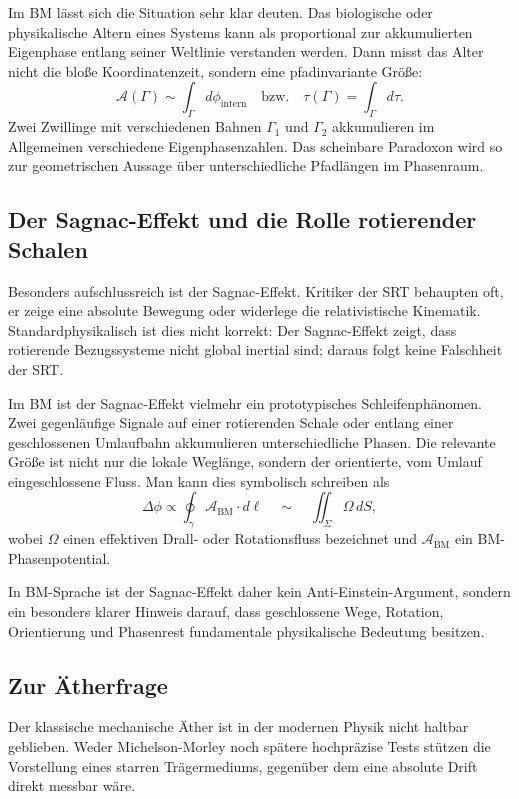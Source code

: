 \documentclass[12pt,a4paper]{article}
\begin{document}
	Im BM lässt sich die Situation sehr klar deuten. Das biologische oder physikalische Altern eines Systems kann als proportional zur akkumulierten Eigenphase entlang seiner Weltlinie verstanden werden. Dann misst das Alter nicht die bloße Koordinatenzeit, sondern eine pfadinvariante Größe:
	\[
	\mathcal{A}(\Gamma) \sim \int_{\Gamma} d\phi_{\mathrm{intern}}
	\quad\text{bzw.}\quad
	\tau(\Gamma) = \int_{\Gamma} d\tau.
	\]
	Zwei Zwillinge mit verschiedenen Bahnen \(\Gamma_1\) und \(\Gamma_2\) akkumulieren im Allgemeinen verschiedene Eigenphasenzahlen. Das scheinbare Paradoxon wird so zur geometrischen Aussage über unterschiedliche Pfadlängen im Phasenraum.
	
	\subsection{Der Sagnac-Effekt und die Rolle rotierender Schalen}
	
	Besonders aufschlussreich ist der Sagnac-Effekt. Kritiker der SRT behaupten oft, er zeige eine absolute Bewegung oder widerlege die relativistische Kinematik. Standardphysikalisch ist dies nicht korrekt: Der Sagnac-Effekt zeigt, dass rotierende Bezugssysteme nicht global inertial sind; daraus folgt keine Falschheit der SRT.
	
	Im BM ist der Sagnac-Effekt vielmehr ein prototypisches Schleifenphänomen. Zwei gegenläufige Signale auf einer rotierenden Schale oder entlang einer geschlossenen Umlaufbahn akkumulieren unterschiedliche Phasen. Die relevante Größe ist nicht nur die lokale Weglänge, sondern der orientierte, vom Umlauf eingeschlossene Fluss. Man kann dies symbolisch schreiben als
	\[
	\Delta \phi \propto \oint_{\gamma} \mathcal{A}_{\mathrm{BM}} \cdot d\ell
	\quad\sim\quad
	\iint_{\Sigma} \Omega \, dS,
	\]
	wobei \(\Omega\) einen effektiven Drall- oder Rotationsfluss bezeichnet und \(\mathcal{A}_{\mathrm{BM}}\) ein BM-Phasenpotential.
	
	In BM-Sprache ist der Sagnac-Effekt daher kein Anti-Einstein-Argument, sondern ein besonders klarer Hinweis darauf, dass geschlossene Wege, Rotation, Orientierung und Phasenrest fundamentale physikalische Bedeutung besitzen.
	
	\subsection{Zur Ätherfrage}
	
	Der klassische mechanische Äther ist in der modernen Physik nicht haltbar geblieben. Weder Michelson-Morley noch spätere hochpräzise Tests stützen die Vorstellung eines starren Trägermediums, gegenüber dem eine absolute Drift direkt messbar wäre.
	
\end{document}
